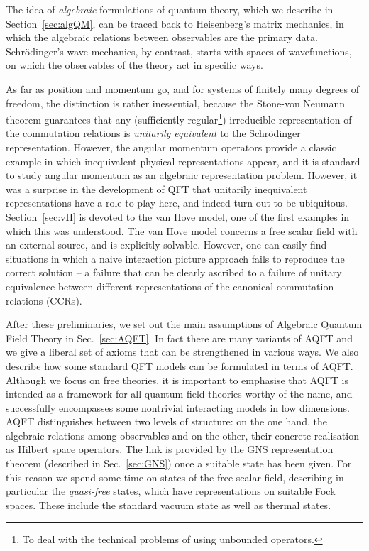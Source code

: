 \documentclass[12pt]{article}
\newcommand{\1}{\mathds{1}}                         %
\begin{document}
	The idea of \emph{algebraic} formulations of quantum theory, which we describe in Section~\ref{sec:algQM}, can be traced
	back to Heisenberg's matrix mechanics, in which the algebraic relations between
	observables are the primary data. Schr\"odinger's wave mechanics, by contrast,
	starts with spaces of wavefunctions, on which the observables of the theory act in specific ways.
	
	As far as position and momentum go, and for systems of finitely many degrees of freedom, the distinction is rather inessential, because the Stone-von Neumann theorem guarantees that any (sufficiently regular\footnote{To deal with the technical problems of using unbounded operators.}) irreducible representation
	of the commutation relations is \emph{unitarily equivalent} to the Schr\"odinger representation. However, the angular momentum operators provide a classic example in which inequivalent physical representations appear, and it is standard
	to study angular momentum as an algebraic representation problem. 
	However, it was a surprise in the development of QFT that unitarily inequivalent representations have a role to play here, and indeed turn out to be ubiquitous. Section~\ref{sec:vH} is devoted to the van Hove model, one of the first examples in which this was understood. The van Hove model concerns a free scalar field with an external source, and is explicitly solvable. However, one can easily find situations in which a naive interaction picture approach fails to reproduce the correct solution -- a failure that can be clearly ascribed to a failure of unitary equivalence between different representations of the canonical commutation relations (CCRs).
	
	After these preliminaries, we set out the main assumptions of Algebraic Quantum Field Theory in Sec.~\ref{sec:AQFT}. In fact there are many variants of AQFT and we give a liberal set of axioms that can be strengthened in various ways. We also describe how some standard QFT models can be formulated in terms of AQFT. Although we focus on free theories, it is important to emphasise that AQFT is intended as a framework for all quantum field theories worthy of the name, and successfully encompasses some
	nontrivial interacting models in low dimensions. AQFT distinguishes between two levels of structure: on the one hand, the algebraic relations among observables and on the other, their concrete realisation as Hilbert space operators. The link is provided by the GNS representation theorem (described in Sec.~\ref{sec:GNS}) once a suitable state has been given. For this reason we spend some time on states of the free scalar field, describing in particular the \emph{quasi-free} states, which have representations on suitable Fock spaces. These include the standard vacuum state as well as thermal states.
	
\end{document}
